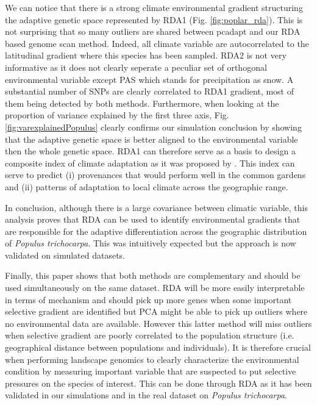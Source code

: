 \documentclass[a4paper,times,10pt,authoryear]{article}%
\begin{document}
We can notice that there is a strong climate environmental gradient structuring the adaptive genetic space represented by RDA1 (Fig. \ref{fig:poplar_rda}). This is not surprising that so many outliers are shared between pcadapt and our RDA based genome scan method. Indeed, all climate variable are autocorrelated to the latitudinal gradient where this species has been sampled. RDA2 is not very informative as it does not clearly seperate a peculiar set of orthogonal environmental variable except PAS which stands for precipitation as snow. A substantial number of SNPs are clearly correlated to RDA1 gradient, most of them being detected by both methods. Furthermore, when looking at the proportion of variance explained by the first three axis, Fig. \ref{fig:varexplainedPopulus} clearly confirms our simulation conclusion by showing that the adaptive genetic space is better aligned to the environmental variable then the whole genetic space. RDA1 can therefore serve as a basis to design a composite index of climate adaptation as it was proposed by \citet{Steane2014a}. This index can serve to predict (i) provenances that would perform well in the common gardens and (ii) patterns of adaptation to local climate across the geographic range.

In conclusion, although there is a large covariance between climatic variable, this analysis proves that RDA can be used to identify environmental gradients that are responsible for the adaptive differentiation across the geographic distribution of \textit{Populus trichocarpa}. This was intuitively expected but the approach is now validated on simulated datasets.

Finally, this paper shows that both methods are complementary and should be used simultaneously on the same dataset. RDA will be more easily interpretable in terms of mechanism and should pick up more genes when some important selective gradient are identified but PCA might be able to pick up outliers where no environmental data are available. However this latter method will miss outliers when selective gradient are poorly correlated to the population structure (i.e. geographical distance between populations and individuals). It is therefore crucial when performing landscape genomics to clearly characterize the environmental condition by measuring important variable that are suspected to put selective pressures on the species of interest. This can be done through RDA as it has been validated in our simulations and in the real dataset on \textit{Populus trichocarpa}. 
\end{document}
